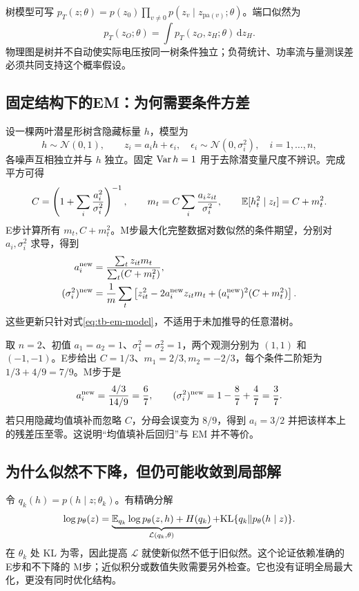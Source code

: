 树模型可写 $p_T(z;\theta)=p(z_0)\prod_{v\ne0}p(z_v\mid z_{\mathrm{pa}(v)};\theta)$。端口似然为
\begin{equation}
 p_T(z_O;\theta)=\int p_T(z_O,z_H;\theta)\,\mathrm dz_H.
\end{equation}
物理图是树并不自动使实际电压按同一树条件独立；负荷统计、功率流与量测误差必须共同支持这个概率假设。

\subsection{固定结构下的EM：为何需要条件方差}
设一棵两叶潜星形树含隐藏标量 $h$，模型为
\begin{equation}
 h\sim\mathcal N(0,1),\qquad z_i=a_i h+\epsilon_i,
 \quad\epsilon_i\sim\mathcal N(0,\sigma_i^2),\quad i=1,\ldots,n,
 \label{eq:tb-em-model}
\end{equation}
各噪声互相独立并与 $h$ 独立。固定 $\operatorname{Var} h=1$ 用于去除潜变量尺度不辨识。完成平方可得
\begin{equation}
 C=\left(1+\sum_i\frac{a_i^2}{\sigma_i^2}\right)^{-1},\qquad
 m_t=C\sum_i\frac{a_i z_{it}}{\sigma_i^2},\qquad
 \mathbb{E}[h_t^2\mid z_t]=C+m_t^2.
 \label{eq:tb-em-estep}
\end{equation}
E步计算所有 $m_t,C+m_t^2$。M步最大化完整数据对数似然的条件期望，分别对 $a_i,\sigma_i^2$ 求导，得到
\begin{align}
 a_i^{\rm new}&=\frac{\sum_tz_{it}m_t}{\sum_t(C+m_t^2)},\\
 (\sigma_i^2)^{\rm new}
 &=\frac1m\sum_t\left[z_{it}^2-2a_i^{\rm new}z_{it}m_t
 +(a_i^{\rm new})^2(C+m_t^2)\right].\label{eq:tb-em-mstep}
\end{align}
这些更新只针对式\eqref{eq:tb-em-model}，不适用于未加推导的任意潜树。

\begin{example}[完整手算一轮EM]
取 $n=2$、初值 $a_1=a_2=1$、$\sigma_1^2=\sigma_2^2=1$，两个观测分别为 $(1,1)$ 和 $(-1,-1)$。E步给出 $C=1/3$、$m_1=2/3,m_2=-2/3$，每个条件二阶矩为 $1/3+4/9=7/9$。M步于是
\begin{equation}
 a_i^{\rm new}=\frac{4/3}{14/9}=\frac67,\qquad
 (\sigma_i^2)^{\rm new}=1-\frac87+\frac47=\frac37.
\end{equation}
若只用隐藏均值填补而忽略 $C$，分母会误变为 $8/9$，得到 $a_i=3/2$ 并把该样本上的残差压至零。这说明“均值填补后回归”与 EM 并不等价。
\end{example}

\subsection{为什么似然不下降，但仍可能收敛到局部解}
令 $q_k(h)=p(h\mid z;\theta_k)$。有精确分解
\begin{equation}
 \log p_\theta(z)=
 \underbrace{\mathbb{E}_{q_k}\log p_\theta(z,h)+H(q_k)}_{\mathcal L(q_k,\theta)}
 +\mathrm{KL}\{q_k\Vert p_\theta(h\mid z)\}.
\end{equation}
在 $\theta_k$ 处 KL 为零，因此提高 $\mathcal L$ 就使新似然不低于旧似然。这个论证依赖准确的 E步和不下降的 M步；近似积分或数值失败需要另外检查。它也没有证明全局最大化，更没有同时优化结构。

